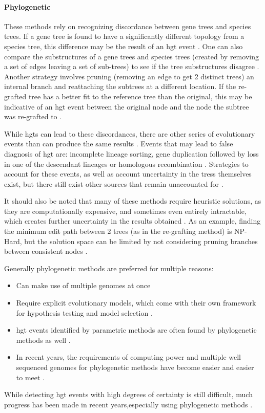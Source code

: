 \paragraph{Phylogenetic}
These methods rely on recognizing discordance between gene trees and species trees.
If a gene tree is found to have a significantly different topology from a species tree, this difference may be the result of an \ac{hgt} event \citep{hgterr}.
One can also compare the substructures of a gene trees and species trees (created by removing a set of edges leaving a set of sub-trees) to see if the tree substructures disagree \citep{ihgt}.
Another strategy involves pruning (removing an edge to get 2 distinct trees) an internal branch and reattaching the subtrees at a different location.
If the re-grafted tree has a better fit to the reference tree than the original, this may be indicative of an \ac{hgt} event between the original node and the node the subtree was re-grafted to \citep{ihgt}.\par
While \ac{hgt}s can lead to these discordances, there are other series of evolutionary events than can produce the same results \citep{hgterr}.
Events that may lead to false diagnosis of \ac{hgt} are: incomplete lineage sorting, gene duplication followed by loss in one of the descendant lineages or homologous recombination \citep{ihgt,hgterr}.
Strategies to account for these events, as well as account uncertainty in the tress themselves exist, but there still exist other sources that remain unaccounted for \citep{hgterr}.\par
It should also be noted that many of these methods require heuristic solutions, as they are computationally expensive, and sometimes even entirely intractable, which creates further uncertainty in the results obtained \citep{ihgt}.
As an example, finding the minimum edit path between 2 trees (as in the re-grafting method) is NP-Hard, but the solution space can be limited by not considering pruning branches between consistent nodes \citep{sprnp,ihgt}.\par\par
Generally phylogenetic methods are preferred for multiple reasons:
\begin{itemize}
    \item Can make use of multiple genomes at once \citep{ihgt}
    \item Require explicit evolutionary models, which come with their own framework for hypothesis testing and model selection \citep{ihgt}.
    \item \ac{hgt} events identified by parametric methods are often found by phylogenetic methods as well \citep{ihgt}.
    \item In recent years, the requirements of computing power and  multiple well sequenced genomes for phylogenetic methods have become easier and easier to meet \citep{ihgt}.
\end{itemize}
While detecting \ac{hgt} events with high degrees of certainty is still difficult, much progress has been made in recent years,especially using phylogenetic methods \citep{ihgt}.
